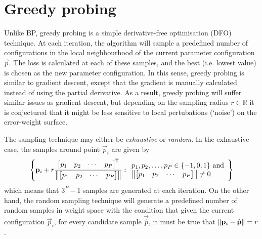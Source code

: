 \section{Greedy probing}
\label{sec:greedy_probing}
Unlike BP, greedy probing is a simple derivative-free optimisation (DFO) technique. 
At each iteration, the algorithm will sample a predefined number of configurations in the local neighbourhood of the current parameter configuration $\vec{p}$. 
The loss is calculated at each of these samples, and the best (i.e. lowest value) is chosen as the new parameter configuration. 
In this sense, greedy probing is similar to gradient descent, except that the gradient is manually calculated instead of using the partial derivative.
As a result, greedy probing will suffer similar issues as gradient descent, but depending on the sampling radius $r \in \mathbb{R}$ it is conjectured that it might be less sensitive to local pertubations (`noise') on the error-weight surface.

The sampling technique may either be \textit{exhaustive} or \textit{random}.
In the exhaustive case, the samples around point $\vec{p}_i$ are given by
\begin{equation}
    \left\{
        \mathbf{p}_i + r
        \frac{
            \begin{bmatrix}
                p_1 & p_2 & \cdots & p_P
            \end{bmatrix}^{\mkern-1.5mu\mathsf{T}}
        }{
            \left\lVert
                \begin{bmatrix}
                    p_1 & p_2 & \cdots & p_P
                \end{bmatrix}
            \right\rVert
        }
        : \begin{array}{l}
            \text{$p_1, p_2, \dots, p_P \in \left\{-1,0,1\right\}$ and} \\
            \left\lVert
                \begin{bmatrix}
                    p_1 & p_2 & \cdots & p_P
                \end{bmatrix}
            \right\rVert \neq 0
        \end{array}
    \right\}
\end{equation}
which means that $3^P-1$ samples are generated at each iteration.
On the other hand, the random sampling technique will generate a predefined number of random samples in weight space with the condition that given the current configuration $\vec{p}_i$, for every candidate sample $\vec{\hat{p}}$, it must be true that
$\left\lVert\mathbf{p}_i - \mathbf{\hat{p}}\right\rVert = r$.

